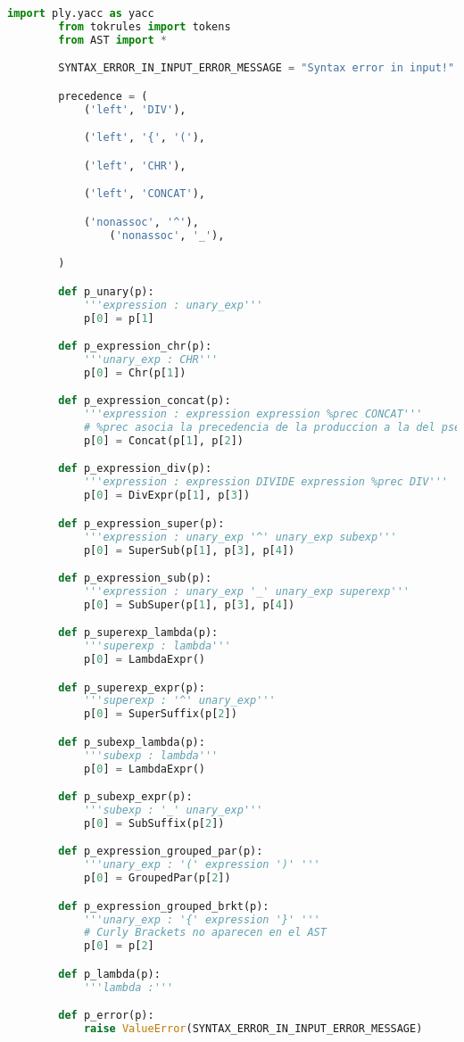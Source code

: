     \begin{lstlisting}[language=Python]
        import ply.yacc as yacc
        from tokrules import tokens
        from AST import *

        SYNTAX_ERROR_IN_INPUT_ERROR_MESSAGE = "Syntax error in input!"

        precedence = (
            ('left', 'DIV'),

            ('left', '{', '('),

            ('left', 'CHR'),

            ('left', 'CONCAT'),

            ('nonassoc', '^'),
                ('nonassoc', '_'),

        )

        def p_unary(p):
            '''expression : unary_exp'''
            p[0] = p[1]

        def p_expression_chr(p):
            '''unary_exp : CHR'''
            p[0] = Chr(p[1])

        def p_expression_concat(p):
            '''expression : expression expression %prec CONCAT'''
            # %prec asocia la precedencia de la produccion a la del pseudosimbolo CONCAT
            p[0] = Concat(p[1], p[2])

        def p_expression_div(p):
            '''expression : expression DIVIDE expression %prec DIV'''
            p[0] = DivExpr(p[1], p[3])

        def p_expression_super(p):
            '''expression : unary_exp '^' unary_exp subexp'''
            p[0] = SuperSub(p[1], p[3], p[4])

        def p_expression_sub(p):
            '''expression : unary_exp '_' unary_exp superexp'''
            p[0] = SubSuper(p[1], p[3], p[4])

        def p_superexp_lambda(p):
            '''superexp : lambda'''
            p[0] = LambdaExpr()

        def p_superexp_expr(p):
            '''superexp : '^' unary_exp'''
            p[0] = SuperSuffix(p[2])

        def p_subexp_lambda(p):
            '''subexp : lambda'''
            p[0] = LambdaExpr()

        def p_subexp_expr(p):
            '''subexp : '_' unary_exp'''
            p[0] = SubSuffix(p[2])

        def p_expression_grouped_par(p):
            '''unary_exp : '(' expression ')' '''
            p[0] = GroupedPar(p[2])

        def p_expression_grouped_brkt(p):
            '''unary_exp : '{' expression '}' '''
            # Curly Brackets no aparecen en el AST
            p[0] = p[2]

        def p_lambda(p):
            '''lambda :'''

        def p_error(p):
            raise ValueError(SYNTAX_ERROR_IN_INPUT_ERROR_MESSAGE)

    \end{lstlisting}


